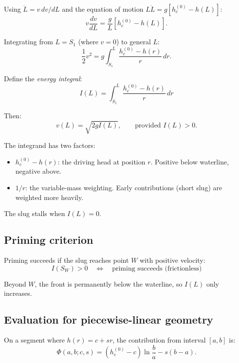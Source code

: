 \documentclass[11pt]{article}
\begin{document}
Using $\ddot{L} = v \, dv/dL$ and the equation of motion $L \ddot{L} = g[h_c^{(0)} - h(L)]$:
\begin{equation}
  v \frac{dv}{dL} = \frac{g}{L}[h_c^{(0)} - h(L)].
  \label{eq:v-dv-dL}
\end{equation}

Integrating from $L = S_1$ (where $v = 0$) to general $L$:
\[
  \frac{1}{2}v^2 = g \int_{S_1}^{L} \frac{h_c^{(0)} - h(r)}{r} \, dr.
\]

Define the \emph{energy integral}:
\begin{equation}
  \boxed{I(L) = \int_{S_1}^{L} \frac{h_c^{(0)} - h(r)}{r} \, dr}
  \label{eq:energy-integral}
\end{equation}

Then:
\begin{equation}
  v(L) = \sqrt{2 g I(L)}, \qquad \text{provided } I(L) > 0.
  \label{eq:v-from-I}
\end{equation}

The integrand has two factors:
\begin{itemize}[nosep,leftmargin=2em]
  \item $h_c^{(0)} - h(r)$: the driving head at position $r$. Positive below waterline, negative above.
  \item $1/r$: the variable-mass weighting. Early contributions (short slug) are weighted more heavily.
\end{itemize}

The slug stalls when $I(L) = 0$.

\subsection{Priming criterion}

Priming succeeds if the slug reaches point $W$ with positive velocity:
\begin{equation}
  \boxed{I(S_W) > 0 \quad \Longleftrightarrow \quad \text{priming succeeds (frictionless)}}
  \label{eq:priming-criterion}
\end{equation}

Beyond $W$, the front is permanently below the waterline, so $I(L)$ only increases.

\subsection{Evaluation for piecewise-linear geometry}

On a segment where $h(r) = c + sr$, the contribution from interval $[a, b]$ is:
\begin{equation}
  \Phi(a, b; c, s) = (h_c^{(0)} - c) \ln\frac{b}{a} - s(b - a).
  \label{eq:Phi-def}
\end{equation}
\end{document}

